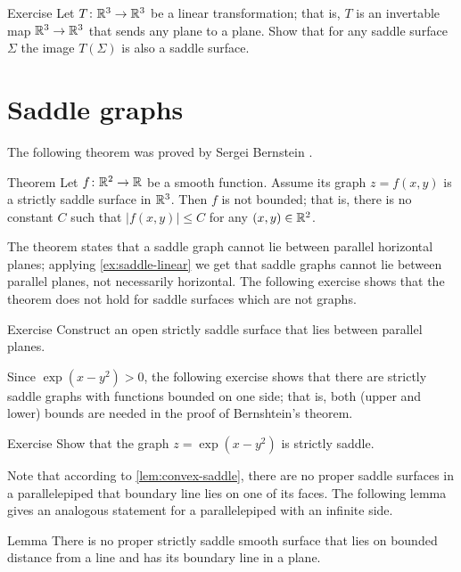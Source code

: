 \begin{thm}{Exercise}\label{ex:saddle-linear}
Let $T\colon\mathbb{R}^3\to\mathbb{R}^3$ be a linear transformation; that is, $T$ is an invertable map $\mathbb{R}^3\to\mathbb{R}^3$ that sends any plane to a plane. 
Show that for any saddle surface $\Sigma$ the image $T(\Sigma)$ is also a saddle surface.
\end{thm}

\section*{Saddle graphs}

The following theorem was proved by Sergei Bernstein \cite{bernstein}.

\begin{thm}{Theorem}\label{thm:bernshtein}
Let $f\colon\mathbb{R}^2\to\mathbb{R}$ be a smooth function.
Assume its graph $z=f(x,y)$ is a strictly saddle surface in $\mathbb{R}^3$.
Then $f$ is not bounded;
that is, there is no constant $C$ such that 
$|f(x,y)|\le C$ for any $(x,y)\in\mathbb{R}^2$.
\end{thm}

The theorem states that a saddle graph cannot lie between parallel horizontal planes;
applying \ref{ex:saddle-linear} we get that saddle graphs cannot lie between parallel planes,
not necessarily horizontal.
The following exercise shows that the theorem does not hold for saddle surfaces which are not graphs.


\begin{thm}{Exercise}\label{ex:between-parallels}
Construct an open strictly saddle surface that lies between parallel planes.
\end{thm}

Since $\exp(x-y^2)>0$,
the following exercise shows that there are strictly saddle graphs with functions bounded on one side; that is, both (upper and lower) bounds are needed in the proof of Bernshtein's theorem.

\begin{thm}{Exercise}\label{ex:one-side-bernshtein}
Show that the graph
$z=\exp(x-y^2)$
is strictly saddle.
\end{thm}

Note that according to \ref{lem:convex-saddle}, there are no proper saddle surfaces in a parallelepiped that boundary line lies on one of its faces.
The following lemma gives an analogous statement for a parallelepiped with an infinite side.

\begin{thm}{Lemma}\label{lem:region}
There is no proper strictly saddle smooth surface that lies on bounded distance from a line
and has its boundary line in a plane.
\end{thm}


